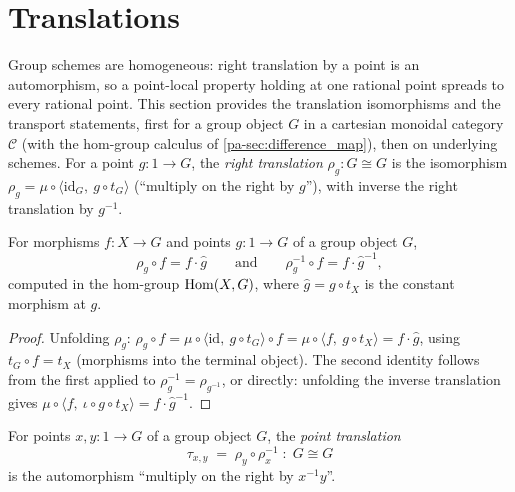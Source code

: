 \section{Translations}
\label{pa-sec:translations}

Group schemes are homogeneous: right translation by a point is an
automorphism, so a point-local property holding at one rational point spreads
to every rational point. This section provides the translation isomorphisms
and the transport statements, first for a group object \(G\) in a cartesian
monoidal category \(\mathcal C\) (with the hom-group calculus of
\ref{pa-sec:difference_map}), then on underlying schemes. For a point
\(g : 1 \to G\), the \emph{right translation} \(\rho_g : G \cong G\) is the
isomorphism \(\rho_g = \mu \circ \langle \mathrm{id}_G,\ g \circ t_G\rangle\)
(``multiply on the right by \(g\)''), with inverse the right translation by
\(g^{-1}\).

\begin{lemma}
  \label{pa-lem:comp_mulRight}
  \leanok

  For morphisms \(f : X \to G\) and points \(g : 1 \to G\) of a group object
  \(G\),
  \[
    \rho_g \circ f = f \cdot \hat g
    \qquad\text{and}\qquad
    \rho_g^{-1} \circ f = f \cdot \hat g^{-1},
  \]
  computed in the hom-group \(\operatorname{Hom}(X, G)\), where
  \(\hat g = g \circ t_X\) is the constant morphism at \(g\).
\end{lemma}
\begin{proof}
  \leanok
  Unfolding \(\rho_g\): \(\rho_g \circ f = \mu \circ \langle \mathrm{id},\ g
  \circ t_G\rangle \circ f = \mu \circ \langle f,\ g \circ t_X\rangle
  = f \cdot \hat g\), using \(t_G \circ f = t_X\) (morphisms into the terminal
  object). The second identity follows from the first applied to
  \(\rho_g^{-1} = \rho_{g^{-1}}\), or directly: unfolding the inverse
  translation gives \(\mu \circ \langle f,\ \iota \circ g \circ t_X\rangle =
  f \cdot \hat g^{-1}\).
\end{proof}

\begin{definition}
  \label{pa-def:point_translation}
  \leanok

  For points \(x, y : 1 \to G\) of a group object \(G\), the
  \emph{point translation}
  \[
    \tau_{x,y} \;=\; \rho_y \circ \rho_x^{-1} \;:\; G \cong G
  \]
  is the automorphism ``multiply on the right by \(x^{-1} y\)''.
\end{definition}

